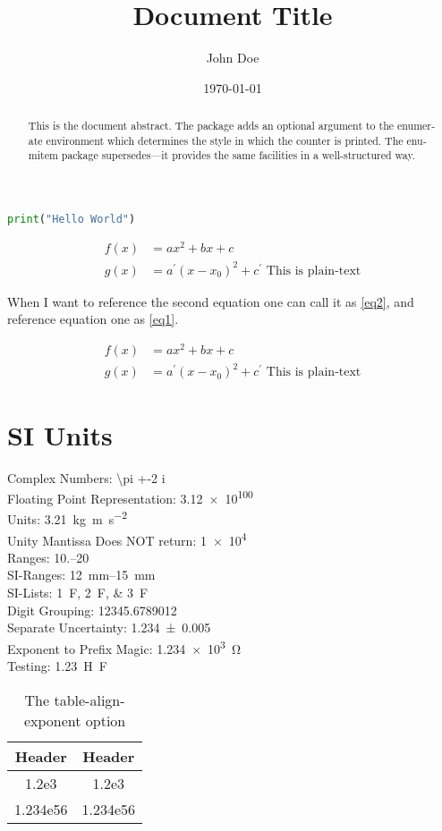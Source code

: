 \documentclass{StdTemplate}
\title{Document Title}
\author{John Doe}
\date{\today}
\begin{document}

\begin{abstract}
    This is the document abstract. The pack­age adds an op­tional ar­gu­ment to the enu­mer­ate en­vi­ron­ment which de­ter­mines the style in which the counter is printed. The en­u­mitem pack­age su­per­sedes—it pro­vides the same fa­cil­i­ties in a well-struc­tured way.
\end{abstract}

\begin{lstlisting}[language=Python, caption=Now It's Captioned, label=label1]
print("Hello World")
\end{lstlisting}

\begin{align}
f(x) &= a x^2 + b x + c\label{eq1}\\
g(x) &= a^\prime (x - x_0)^2 + c^\prime \text{ This is plain-text}\label{eq2}
\end{align}

When I want to reference the second equation one can call it as \ref{eq2}, and reference equation one as \ref{eq1}.

\begin{align*}
f(x) &= a x^2 + b x + c\\
g(x) &= a^\prime (x - x_0)^2 + c^\prime \text{ This is plain-text}
\end{align*}

\section{SI Units}
Complex Numbers: \num{\pi +-2 i}\\
Floating Point Representation: \num{3.12e100}\\
Units: \SI{3.21}{\kilo\gram\meter\per\second\squared}\\ %
Unity Mantissa Does NOT return: \num{1e4}\\
Ranges: \numrange{10.}{20}\\
SI-Ranges: \SIrange{12}{15}{\milli\metre}\\
SI-Lists: \SIlist{1;2;3}{\farad}\\
Digit Grouping: \num{12345.6789012}\\
Separate Uncertainty: \num{1.234(5)}\\
Exponent to Prefix Magic: \SI{1.234e3}{\ohm}\\
Testing: \SI{1.23}{\henry\farad}

\begin{table}[hb!]
\centering
\caption{The {table-align-exponent} option}
\label{tab:align:exp}
\begin{tabular}{SS[table-align-exponent = false]}
\toprule
{Header} & {Header} \\
\midrule
1.2e3 & 1.2e3 \\
1.234e56 & 1.234e56 \\
\bottomrule
\end{tabular}
\end{table}
\end{document}
